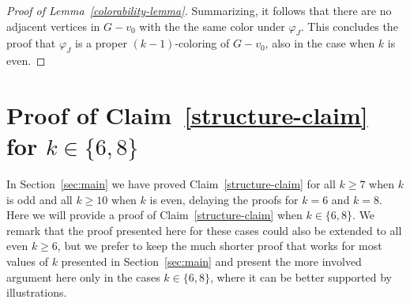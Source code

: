 \documentclass[a4paper,10pt,hidelinks]{amsart}
\renewcommand{\phi}{\ensuremath{\varphi}}
\theoremstyle{definition}
\begin{document}
\begin{proof}[Proof of Lemma~\ref{colorability-lemma}]
    Summarizing, it follows that there are no adjacent vertices in $G-v_0$ with the the same color under $\phi_J$. This concludes the proof that $\varphi_J$ is a proper $(k - 1)$-coloring of $G - v_0$, also in the case when $k$ is even. 
\end{proof}

\section{Proof of Claim~\ref{structure-claim} for $k \in \{6,8\}$}\label{sec:68}
In Section~\ref{sec:main} we have proved Claim~\ref{structure-claim} for all $k \geq 7$ when $k$ is odd and all $k \geq 10$ when $k$ is even, delaying the proofs for $k=6$ and $k =8$. Here we will provide a proof of Claim~\ref{structure-claim} when $k \in \{6,8\}$. We remark that the proof presented here for these cases could also be extended to all even $k\ge 6$, but we prefer to keep the much shorter proof that works for most values of $k$ presented in Section~\ref{sec:main} and present the more involved argument here only in the cases $k\in \{6,8\}$, where it can be better supported by illustrations.
\end{document}
